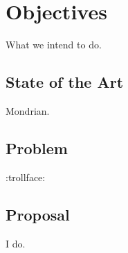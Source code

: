 \chapter{Objectives}

What we intend to do.

\section{State of the Art}

Mondrian.

\section{Problem}

:trollface:

\section{Proposal}

I do.
